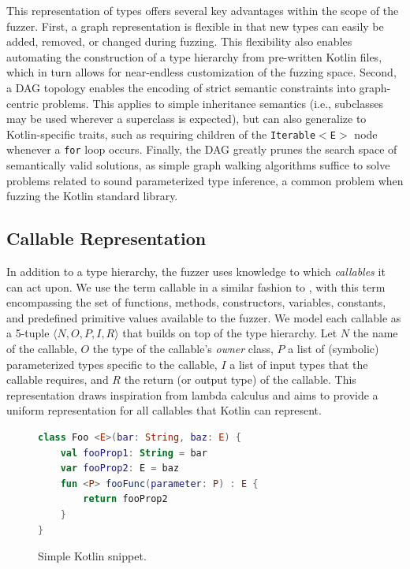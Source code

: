 This representation of types offers several key advantages within the scope of the fuzzer.
First, a graph representation is flexible in that new types can easily be added, removed, or changed
during fuzzing.
This flexibility also enables automating the construction of a type hierarchy
from pre-written Kotlin files, which in turn allows for near-endless customization of the fuzzing space.
Second, a \Gls{DAG} topology enables the encoding of strict semantic constraints into
graph-centric problems.
This applies to simple inheritance semantics
(i.e., subclasses may be used wherever a superclass is expected),
but can also generalize to Kotlin-specific traits,
such as requiring children of the \texttt{Iterable$<$E$>$}
node whenever a \texttt{for} loop occurs.
Finally, the \Gls{DAG} greatly prunes the search space of semantically valid solutions, as simple graph walking
algorithms suffice to solve problems related to sound parameterized type inference, a common problem
when fuzzing the Kotlin standard library.

\subsection{\label{subsec:callables}Callable Representation}
In addition to a type hierarchy, the fuzzer uses knowledge to which \textit{callables}
it can act upon.
We use the term callable in a similar fashion to \citet{stepanov2021type}, with this term encompassing
the set of functions, methods, constructors, variables, constants, and predefined primitive values
available to the fuzzer.
We model each callable as a 5-tuple $\langle N, O, P, I, R \rangle$ that builds on top of the
type hierarchy.
Let $N$ the name of the callable, $O$ the type of the callable's \textit{owner} class,
$P$ a list of (symbolic) parameterized types specific to the callable,
$I$ a list of input types that the callable requires,
and $R$ the return (or output type) of the callable.
This representation draws inspiration from lambda calculus and aims to provide a uniform representation
for all callables that Kotlin can represent.

\lstset{
  basicstyle=\footnotesize, frame=tb,
  xleftmargin=.2\textwidth, xrightmargin=.2\textwidth,
  numbers=left, stepnumber=1,
}

\begin{figure}
\begin{lstlisting}[language=Kotlin]
class Foo <E>(bar: String, baz: E) {
    val fooProp1: String = bar
    var fooProp2: E = baz
    fun <P> fooFunc(parameter: P) : E {
        return fooProp2
    }
}
\end{lstlisting}
\caption{Simple Kotlin snippet.}
\label{fig:callables}
\end{figure}

